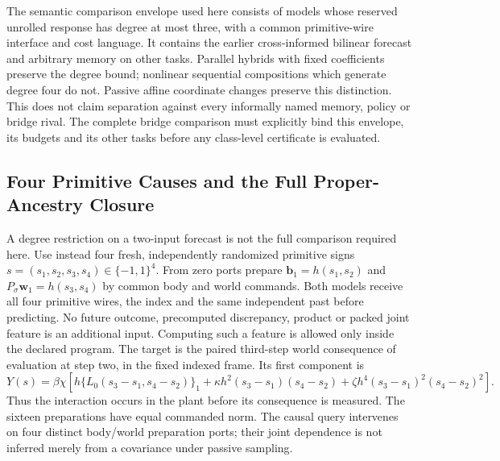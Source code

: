 \documentclass[11pt,a4paper]{article}
\theoremstyle{definition}
\begin{document}
The semantic comparison envelope used here consists of models whose reserved
unrolled response has degree at most three, with a common primitive-wire
interface and cost language. It contains the earlier cross-informed bilinear
forecast and arbitrary memory on other tasks. Parallel hybrids with fixed
coefficients preserve the degree bound; nonlinear sequential compositions
which generate degree four do not. Passive affine coordinate changes
preserve this distinction. This does not claim separation against every
informally named memory, policy or bridge rival. The complete bridge
comparison must explicitly bind this envelope, its budgets and its other
tasks before any class-level certificate is evaluated.

\subsection{Four Primitive Causes and the Full Proper-Ancestry Closure}

A degree restriction on a two-input forecast is not the full comparison
required here. Use instead four fresh, independently randomized primitive
signs $s=(s_1,s_2,s_3,s_4)\in\{-1,1\}^4$. From zero ports prepare
$\mathbf b_1=h(s_1,s_2)$ and $P_\sigma\mathbf w_1=h(s_3,s_4)$ by common
body and world commands. Both models receive all four primitive wires, the
index and the same independent past before predicting. No future outcome,
precomputed discrepancy, product or packed joint feature is an additional
input. Computing such a feature is allowed only inside the declared program.
The target is the paired third-step world consequence of evaluation at step
two, in the fixed indexed frame. Its first component is
\[
 Y(s)=\beta\chi\left[h\{L_0(s_3-s_1,s_4-s_2)\}_1
 +\kappa h^2(s_3-s_1)(s_4-s_2)
 +\zeta h^4(s_3-s_1)^2(s_4-s_2)^2\right].
\]
Thus the interaction occurs in the plant before its consequence is measured.
The sixteen preparations have equal commanded norm. The causal query
intervenes on four distinct body/world preparation ports; their joint
dependence is not inferred merely from a covariance under passive sampling.
\end{document}
